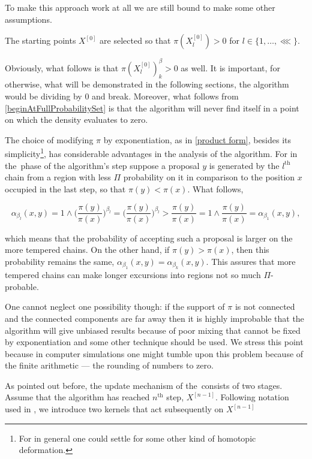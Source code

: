 \documentclass{article}
\begin{document}
To make this approach work at all we are still bound to make some other assumptions. 

\begin{assumptions}[resume]
	\item The starting points $X^{[0]}$ are selected so that $\pi(X_l^{[0]}) > 0$ for $l \in \{1,\dots,\lll\}$.\label{beginAtFullProbabilitySet}
\end{assumptions}
	
Obviously, what follows is that $\pi(X_l^{[0]})^\beta_k > 0$ as well. It is important, for otherwise, what will be demonstrated in the following sections, the algorithm would be dividing by $0$ and break. Moreover, what follows from \ref{beginAtFullProbabilitySet} is that the algorithm will never find itself in a point on which the density evaluates to zero.  

The choice of modifying $\pi$ by exponentiation, as in \ref{product form}, besides its simplicity\footnote{For in general one could settle for some other kind of homotopic deformation.}, has considerable advantages in the analysis of the algorithm. For in the \randomWalk\,phase of the algorithm's step suppose a proposal $y$ is generated by the $l^\text{th}$ chain from a region with less $\Pi$ probability on it in comparison to the position $x$ occupied in the last step, so that $\pi(y) < \pi(x)$. What follows,

$$ 
	\alpha_{\beta_l}(x,y) =  1 \wedge \Biggl(\frac{\pi(y)}{\pi(x)}\Biggl)^{\beta_l} = 
	\Biggl(\frac{\pi(y)}{\pi(x)}\Biggl)^{\beta_l} > \frac{\pi(y)}{\pi(x)} = 1 \wedge \frac{\pi(y)}{\pi(x)} = \alpha_{\beta_1}(x,y),
$$

which means that the probability of accepting such a proposal is larger on the more tempered chains. On the other hand, if  $\pi(y) > \pi(x)$, then this probability remains the same, $\alpha_{\beta_1}(x,y) = \alpha_{\beta_k}(x,y)$. This assures that more tempered chains can make longer excursions into regions not so much $\Pi$-probable. 

One cannot neglect one possibility though: if the support of $\pi$ is not connected and the connected components are far away then it is highly improbable that the algorithm will give unbiased results because of poor mixing that cannot be fixed by exponentiation and some other technique should be used. We stress this point because in computer simulations one might tumble upon this problem because of the finite arithmetic --- the rounding of numbers to zero.    

As pointed out before, the update mechanism of the \PT\,consists of two stages. Assume that the algorithm has reached $n^\text{th}$ step, $X^{[n-1]}$. Following notation used in \citet*{BM1}, we introduce two kernels that act subsequently on $X^{[n-1]}$
\end{document}
